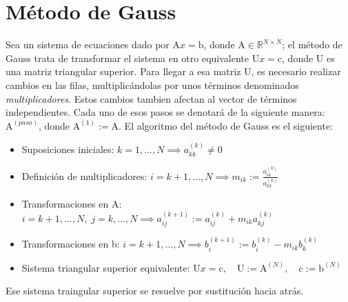 \documentclass{article}
\begin{document}
\section{Método de Gauss}
Sea un sistema de ecuaciones dado por $\text{A}x=\text{b}$, donde $\text{A}\in\mathbb{R}^{N\times N}$; el método de Gauss trata de transformar el sistema en otro equivalente $\text{U}x=\text{c}$, donde U es una matriz triangular superior. Para llegar a esa matriz U, es necesario realizar cambios en las filas, multiplicándolas por unos términos denominados \emph{multiplicadores}. Estos cambios tambien afectan al vector de términos independientes. Cada uno de esos pasos se denotará de la siguiente manera: $\text{A}^{(paso)}$, donde $\text{A}^{(1)}:=\text{A}$. El algoritmo del método de Gauss es el siguiente:
\begin{itemize}
\item Suposiciones iniciales: $k=1,\dots,N\implies a_{kk}^{(k)}\neq 0$
\item Definición de multiplicadores: $i=k+1,\dots,N\implies m_{ik}:=\displaystyle\frac{a_{ik}^{(k)}}{a_{kk}^{(k)}}$
\item Transformaciones en A: $i=k+1,\dots,N,\;j=k,\dots,N\implies a_{ij}^{(k+1)}:=a_{ij}^{(k)}+m_{ik}a_{kj}^{(k)}$
\item Transformaciones en b: $i=k+1,\dots,N\implies b_i^{(k+1)}:=b_i^{(k)}-m_{ik}b_k^{(k)}$
\item Sistema triangular superior equivalente: $\text{U}x=\text{c},\quad\text{U}:=\text{A}^{(N)},\quad\text{c}:=\text{b}^{(N)}$
\end{itemize}
Ese sistema traingular superior se resuelve por sustitución hacia atrás.

\hrulefill
\end{document}

